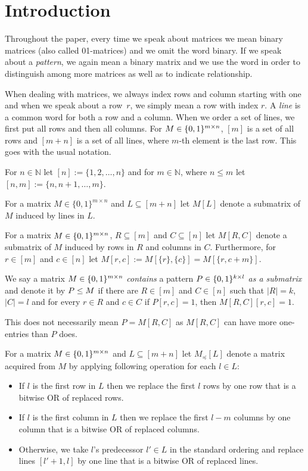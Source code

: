 \chapter{Introduction}
Throughout the paper, every time we speak about matrices we mean binary matrices (also called 01-matrices) and we omit the word binary. If we speak about a \emph{pattern}, we again mean a binary matrix and we use the word in order to distinguish among more matrices as well as to indicate relationship.

When dealing with matrices, we always index rows and column starting with one and when we speak about a row~$r$, we simply mean a row with index $r$. A \emph{line} is a common word for both a row and a column. When we order a set of lines, we first put all rows and then all columns. For $M\in\{0,1\}^{m\times n}$, $[m]$ is a set of all rows and $[m+n]$ is a set of all lines, where $m$-th element is the last row. This goes with the usual notation.
\begin{ntn}
For $n\in\mathbb{N}$ let $[n]:=\{1,2,\dots,n\}$ and for $m\in\mathbb{N}$, where $n\leq m$ let $[n,m]:=\{n,n+1,\dots,m\}$.
\end{ntn}
\begin{ntn}
For a matrix $M\in\{0,1\}^{m\times n}$ and $L\subseteq[m+n]$ let $M[L]$ denote a submatrix of $M$ induced by lines in $L$.
\end{ntn}
\begin{ntn}
For a matrix $M\in\{0,1\}^{m\times n}$, $R\subseteq[m]$ and $C\subseteq[n]$ let $M[R,C]$ denote a submatrix of $M$ induced by rows in $R$ and columns in $C$. Furthermore, for $r\in[m]$ and $c\in[n]$ let $M[r,c]:=M[\{r\},\{c\}]=M[\{r,c+m\}]$.
\end{ntn}
\begin{defn}
We say a matrix $M\in\{0,1\}^{m\times n}$ \emph{contains} a pattern $P\in\{0,1\}^{k\times l}$ \emph{as a submatrix} and denote it by $P\leq M$ if there are $R\in[m]$ and $C\in[n]$ such that $|R|=k$, $|C|=l$ and for every $r\in R$ and $c\in C$ if $P[r,c]=1$, then $M[R,C][r,c]=1$.
\end{defn}
This does not necessarily mean $P=M[R,C]$ as $M[R,C]$ can have more one-entries than $P$ does.
\begin{ntn}
For a matrix $M\in\{0,1\}^{m\times n}$ and $L\subseteq[m+n]$ let $M_{\preceq}[L]$ denote a matrix acquired from $M$ by applying following operation for each $l\in L$:
\begin{itemize}
\item If $l$ is the first row in $L$ then we replace the first $l$ rows by one row that is a bitwise OR of replaced rows.
\item If $l$ is the first column in $L$ then we replace the first $l-m$ columns by one column that is a bitwise OR of replaced columns.
\item Otherwise, we take $l$'s predecessor $l'\in L$ in the standard ordering and replace lines $[l'+1,l]$ by one line that is a bitwise OR of replaced lines.
\end{itemize}
\end{ntn}
